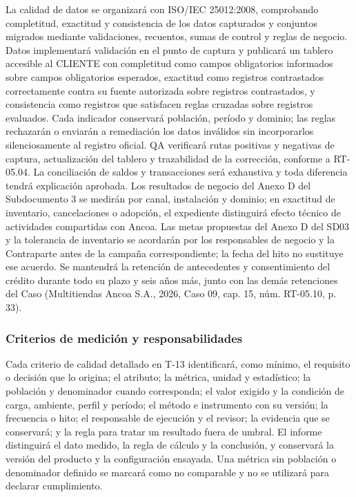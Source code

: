 \documentclass[11pt]{article}
\begin{document}
La calidad de datos se organizará con ISO/IEC 25012:2008, comprobando completitud, exactitud y consistencia de los datos capturados y conjuntos migrados mediante validaciones, recuentos, sumas de control y reglas de negocio. Datos implementará validación en el punto de captura y publicará un tablero accesible al CLIENTE con completitud como campos obligatorios informados sobre campos obligatorios esperados, exactitud como registros contrastados correctamente contra su fuente autorizada sobre registros contrastados, y consistencia como registros que satisfacen reglas cruzadas sobre registros evaluados. Cada indicador conservará población, período y dominio; las reglas rechazarán o enviarán a remediación los datos inválidos sin incorporarlos silenciosamente al registro oficial. QA verificará rutas positivas y negativas de captura, actualización del tablero y trazabilidad de la corrección, conforme a RT-05.04. La conciliación de saldos y transacciones será exhaustiva y toda diferencia tendrá explicación aprobada. Los resultados de negocio del Anexo D del Subdocumento 3 se medirán por canal, instalación y dominio; en exactitud de inventario, cancelaciones o adopción, el expediente distinguirá efecto técnico de actividades compartidas con Ancoa. Las metas propuestas del Anexo D del SD03 y la tolerancia de inventario se acordarán por los responsables de negocio y la Contraparte antes de la campaña correspondiente; la fecha del hito no sustituye ese acuerdo. Se mantendrá la retención de antecedentes y consentimiento del crédito durante todo su plazo y seis años más, junto con las demás retenciones del Caso (Multitiendas Ancoa S.A., 2026, Caso 09, cap. 15, núm. RT-05.10, p. 33).

\subsubsection{Criterios de medición y responsabilidades}

Cada criterio de calidad detallado en T-13 identificará, como mínimo, el requisito o decisión que lo origina; el atributo; la métrica, unidad y estadístico; la población y denominador cuando corresponda; el valor exigido y la condición de carga, ambiente, perfil y período; el método e instrumento con su versión; la frecuencia o hito; el responsable de ejecución y el revisor; la evidencia que se conservará; y la regla para tratar un resultado fuera de umbral. El informe distinguirá el dato medido, la regla de cálculo y la conclusión, y conservará la versión del producto y la configuración ensayada. Una métrica sin población o denominador definido se marcará como no comparable y no se utilizará para declarar cumplimiento.
\end{document}
